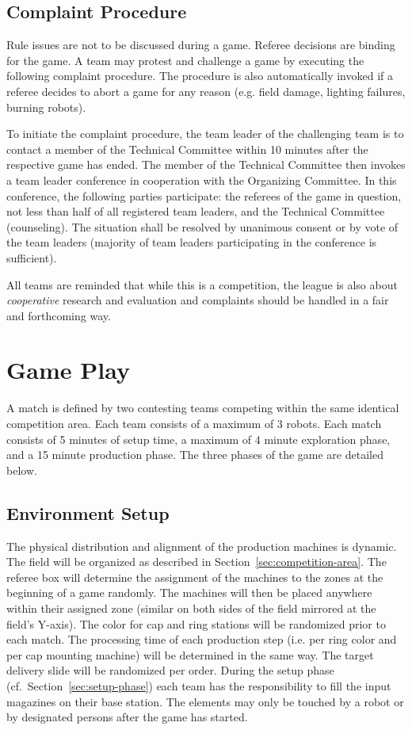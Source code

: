 \documentclass[12pt,twoside]{article}
\newcommand{\refsec}[1]{Section~\ref{#1}}
\begin{document}
\subsection{Complaint Procedure}
Rule issues are not to be discussed during a game. Referee decisions
are binding for the game. A team may protest and challenge a game by
executing the following complaint procedure. The procedure is also
automatically invoked if a referee decides to abort a game for any
reason (e.g. field damage, lighting failures, burning robots).

To initiate the complaint procedure, the team leader of the
challenging team is to contact a member of the Technical Committee
within 10 minutes after the respective game has ended. The member of
the Technical Committee then invokes a team leader conference in
cooperation with the Organizing Committee. In this conference, the
following parties participate: the referees of the game in question,
not less than half of all registered team leaders, and the Technical
Committee (counseling). The situation shall be resolved by unanimous
consent or by vote of the team leaders (majority of team leaders
participating in the conference is sufficient).

All teams are reminded that while this is a competition, the league is
also about \emph{cooperative} research and evaluation and complaints
should be handled in a fair and forthcoming way.

\section{Game Play}
A match is defined by two contesting teams competing within the same
identical competition area. Each team consists of a maximum of 3
robots. Each match consists of 5 minutes of setup time, a maximum of 4
minute exploration phase, and a 15 minute production phase.
The three phases of the game are detailed below.

\subsection{Environment Setup}
\label{sec:env-setup}
The physical distribution and alignment of the production machines is
dynamic. The field will be organized as described in
\refsec{sec:competition-area}. The referee box will determine the
assignment of the machines to the zones at the beginning of a game
randomly. The machines will then be placed anywhere within their
assigned zone (similar on both sides of the field mirrored at the
field's Y-axis). The color for cap and ring stations will be
randomized prior to each match. The processing time of each production
step (i.e. per ring color and per cap mounting machine) will be
determined in the same way. The target delivery slide will be
randomized per order. During the setup phase
(cf.~\refsec{sec:setup-phase}) each team has the responsibility to
fill the input magazines on their base station. The elements may only
be touched by a robot or by designated persons after the game has
started.
\end{document}
